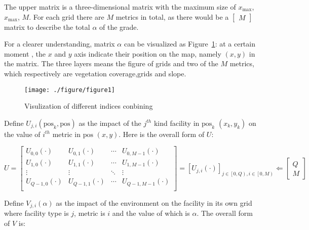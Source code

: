 \documentclass[./main.tex]{subfiles}
\begin{document}
        The upper matrix is a three-dimensional matrix with the maximum size of $x_{\max}$, $x_{\max}$, $M$.
        For each grid there are $M$ metrics in total, as there would be a $\begin{bmatrix} M \end{bmatrix}$
matrix to
describe the total $\alpha$ of the grade.

        For a clearer understanding, matrix $\alpha$ can be visualized as Figure~\ref{fig:figureVF}: at a certain moment
, the $x$ and $y$ axis indicate their position on the map, namely $\left(x, y\right)$ in the matrix.
        The three layers means the figure of grids and two of the $M$ metrics, which respectively are vegetation
coverage,grids and slope.

        \begin{figure}[H]
            \centering
            \texttt{[image: ./figure/figure1]}
            \caption{Visulization of different indices conbining}
            \label{fig:figureVF}
        \end{figure}

        Define $U_{j, i}\left(\mathrm{pos}_k, \mathrm{pos}\right)$ as the impact of the $j^{th}$ kind facility in $\mathrm{
    pos}_k$ $\left(
x_k, y_k\right)$ on the value of $i^{th}$ metric in $\mathrm{pos}$ $\left( x, y \right)$.
        Here is the overall form of $U$:

        \begin{equation}
            \label{eq:bma}
            U=
            \begin{bmatrix}
                U_{0,0}(\cdot)&U_{0,1}(\cdot)&\cdots&U_{0,M-1}(\cdot)\\
                U_{1,0}(\cdot)&U_{1,1}(\cdot)&\cdots&U_{1,M-1}(\cdot)\\
                \vdots&\vdots&\ddots&\vdots\\
                U_{Q-1,0}(\cdot)&U_{Q-1,1}(\cdot)&\cdots&U_{Q-1,M-1}(\cdot)\\
            \end{bmatrix}
            =\left [ U_{j,i}\left ( \cdot \right )  \right ]_{j \in \left[0,Q\right),i \in \left[0,M\right)}
            \Leftarrow
            \begin{bmatrix}
                Q\\
                M
            \end{bmatrix}
        \end{equation}

        Define $V_{j, i}\left(\alpha \right)$ as the impact of the environment on the facility in its own grid where
facility type is $j$, metric is $i$ and the value of which is $\alpha$.
        The overall form of $V$ is:
\end{document}
